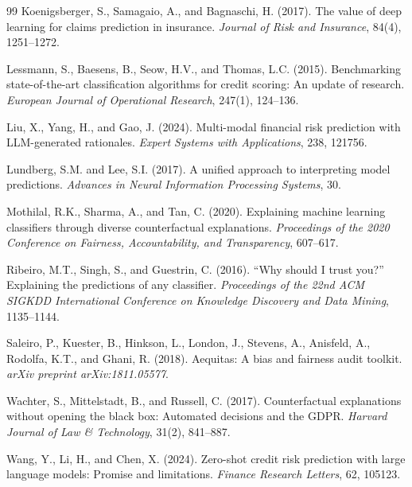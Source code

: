 \documentclass[11pt,a4paper]{article}
\begin{document}
\begin{thebibliography}{99}
Koenigsberger, S., Samagaio, A., and Bagnaschi, H. (2017).
The value of deep learning for claims prediction in insurance.
\emph{Journal of Risk and Insurance}, 84(4), 1251--1272.

Lessmann, S., Baesens, B., Seow, H.V., and Thomas, L.C. (2015).
Benchmarking state-of-the-art classification algorithms for credit scoring: An update of research.
\emph{European Journal of Operational Research}, 247(1), 124--136.

Liu, X., Yang, H., and Gao, J. (2024).
Multi-modal financial risk prediction with LLM-generated rationales.
\emph{Expert Systems with Applications}, 238, 121756.

Lundberg, S.M. and Lee, S.I. (2017).
A unified approach to interpreting model predictions.
\emph{Advances in Neural Information Processing Systems}, 30.

Mothilal, R.K., Sharma, A., and Tan, C. (2020).
Explaining machine learning classifiers through diverse counterfactual explanations.
\emph{Proceedings of the 2020 Conference on Fairness, Accountability, and Transparency}, 607--617.

Ribeiro, M.T., Singh, S., and Guestrin, C. (2016).
``Why should I trust you?'' Explaining the predictions of any classifier.
\emph{Proceedings of the 22nd ACM SIGKDD International Conference on Knowledge Discovery and Data Mining}, 1135--1144.

Saleiro, P., Kuester, B., Hinkson, L., London, J., Stevens, A., Anisfeld, A., Rodolfa, K.T., and Ghani, R. (2018).
Aequitas: A bias and fairness audit toolkit.
\emph{arXiv preprint arXiv:1811.05577}.

Wachter, S., Mittelstadt, B., and Russell, C. (2017).
Counterfactual explanations without opening the black box: Automated decisions and the GDPR.
\emph{Harvard Journal of Law \& Technology}, 31(2), 841--887.

Wang, Y., Li, H., and Chen, X. (2024).
Zero-shot credit risk prediction with large language models: Promise and limitations.
\emph{Finance Research Letters}, 62, 105123.


\end{thebibliography}
\end{document}
